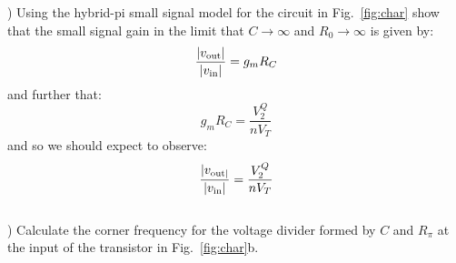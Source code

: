 \documentclass[12pt]{article}
\begin{document}
) Using the hybrid-pi small signal model for the circuit in Fig.~\ref{fig:char} show that the small signal gain in the limit that $C \to \infty$ and $R_0 \to \infty$ is given by:
\begin{displaymath}
\frac{|v_{\rm out}|}{|v_{\rm in}|} = g_m R_C
\end{displaymath}
and further that:
\begin{displaymath}
g_m R_C = \frac{V_2^Q}{nV_T} 
\end{displaymath}
and so we should expect to observe:
\begin{displaymath}
\frac{|v_{\rm out|}}{|v_{\rm in}|} = \frac{V_2^Q}{nV_T}
\end{displaymath}\\

) Calculate the corner frequency for the voltage divider formed by $C$ and $R_\pi$ at the input of the transistor in Fig.~\ref{fig:char}b.
\end{document}
